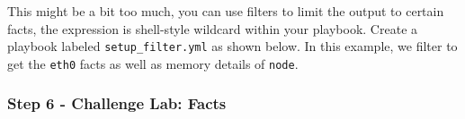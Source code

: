 \begin{Shaded}
\begin{Highlighting}[]
\ExtensionTok{[student@controller}\NormalTok{ ansible{-}files]$ cd \textasciitilde{}}
\ExtensionTok{[student@controller}\NormalTok{ \textasciitilde{}]$ ansible{-}navigator run setup.yml }
\end{Highlighting}
\end{Shaded}

This might be a bit too much, you can use filters to limit the output to
certain facts, the expression is shell-style wildcard within your
playbook. Create a playbook labeled \texttt{setup\_filter.yml} as shown
below. In this example, we filter to get the \texttt{eth0} facts as well
as memory details of \texttt{node}.

\begin{Shaded}
\begin{Highlighting}[]
\PreprocessorTok{{-}{-}{-}}
\KeywordTok{{-}}\AttributeTok{ }\KeywordTok{:}
\AttributeTok{  }\KeywordTok{:}
\AttributeTok{  }\KeywordTok{:}
\AttributeTok{    }\KeywordTok{{-}}\AttributeTok{ }\KeywordTok{:}
\AttributeTok{      }\KeywordTok{:}
\AttributeTok{        }\KeywordTok{:}
\AttributeTok{          }\KeywordTok{{-}}\AttributeTok{ }
\AttributeTok{          }\KeywordTok{{-}}\AttributeTok{ }
\AttributeTok{      }\KeywordTok{:}
\AttributeTok{    }\KeywordTok{{-}}\AttributeTok{ }\KeywordTok{:}
\AttributeTok{        }\KeywordTok{:}
\end{Highlighting}
\end{Shaded}

\begin{Shaded}
\begin{Highlighting}[]
\ExtensionTok{[student@controller}\NormalTok{ ansible{-}files]$ ansible{-}navigator run setup\_filter.yml }
\end{Highlighting}
\end{Shaded}

\hypertarget{step-6---challenge-lab-facts}{%
\subsubsection{Step 6 - Challenge Lab:
Facts}\label{step-6---challenge-lab-facts}}

